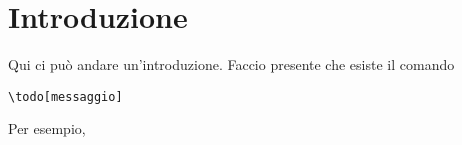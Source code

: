 \chapter*{Introduzione}

Qui ci può andare un'introduzione. Faccio presente che esiste il comando \begin{verbatim}
\todo[messaggio]
\end{verbatim}
Per esempio, 
\vfill\break
